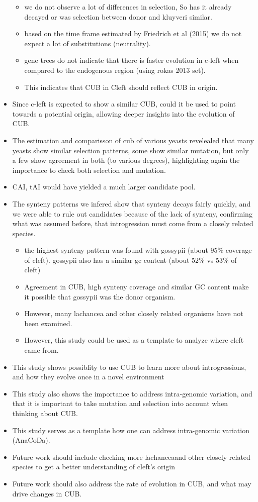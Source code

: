 \documentclass[12pt]{article}
\begin{document}
\begin{itemize}
	\begin{itemize}
		\item we do not observe a lot of differences in selection, So has it already decayed or was selection between donor and kluyveri similar.
		\item based on the time frame estimated by Friedrich et al (2015) we do not expect a lot of substitutions (neutrality).
		\item gene trees do not indicate that there is faster evolution in c-left when compared to the endogenous region (using rokas 2013 set).
		\item This indicates that CUB in Cleft should reflect CUB in origin.
	\end{itemize}
	\item Since c-left is expected to show a similar CUB, could it be used to point towards a potential origin, allowing deeper insights into the evolution of CUB.
	\item The estimation and comparisson of cub of various yeasts revelealed that many yeasts show similar selection patterns, some show similar mutation, but only a few show agreement in both (to various degrees), highlighting again the importance to check both selection and mutation.
	\item CAI, tAI would have yielded a much larger candidate pool.
	\item The synteny patterns we infered show that synteny decays fairly quickly, and we were able to rule out candidates because of the lack of synteny, confirming what was assumed before, that introgression must come from a closely related species. 
	\begin{itemize}
		\item the highest synteny pattern was found with gossypii (about $95 \%$ coverage of cleft). gossypii also has a similar gc content (about $52 \%$ vs $53 \%$ of cleft)
		\item Agreement in CUB, high synteny coverage and similar GC content make it possible that gossypii was the donor organism. 
		\item However, many lachancea and other closely related organisms have not been examined. 
		\item However, this study could be used as a template to analyze where cleft came from.
	\end{itemize}
	\item This study shows possiblity to use CUB to learn more about introgressions, and how they evolve once in a novel environment
	\item This study also shows the importance to address intra-genomic variation, and that it is important to take mutation and selection into account when thinking about CUB.
	\item This study serves as a template how one can address intra-genomic variation (AnaCoDa).
	\item Future work should include checking more lachanceaand other closely related species to get a better understanding of cleft's origin
	\item Future work should also address the rate of evolution in CUB, and what may drive changes in CUB.
\end{itemize}
\end{document}
